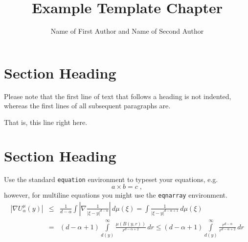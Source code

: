 %

\begin{bibunit}
	
	\title*{Example Template Chapter}
	\author{Name of First Author and Name of Second Author}
	\maketitle
	
	
	\section{Section Heading}\label{sec:1}
	
	Please note that the first line of text that follows a heading is not indented, whereas the first lines of all subsequent paragraphs are.
	
	That is, this line right here.
	
	\section{Section Heading}\label{sec:2}
	
	Use the standard \verb|equation| environment to typeset your equations, e.g.
	\begin{equation}
	a \times b = c\;,
	\end{equation}
	however, for multiline equations you might use the \verb|eqnarray| environment.
	\begin{eqnarray}
	\left|\nabla U_{\alpha}^{\mu}(y)\right| &\le&\frac1{d-\alpha}\int
	\left|\nabla\frac1{|\xi-y|^{d-\alpha}}\right|\,d\mu(\xi) =
	\int \frac1{|\xi-y|^{d-\alpha+1}} \,d\mu(\xi)  \\
	&=&(d-\alpha+1) \int\limits_{d(y)}^\infty
	\frac{\mu(B(y,r))}{r^{d-\alpha+2}}\,dr \le (d-\alpha+1)
	\int\limits_{d(y)}^\infty \frac{r^{d-\alpha}}{r^{d-\alpha+2}}\,dr
	\label{eq:01}
	\end{eqnarray}
	

\end{bibunit}
